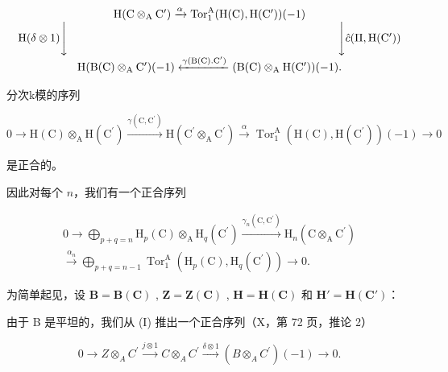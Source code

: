 \[
\begin{array}{c} \mathrm{H} (\mathrm{C} \otimes_ {\mathrm{A}} \mathrm{C} ^ {\prime}) \xrightarrow {\alpha} \operatorname{Tor} _ {1} ^ {\mathrm{A}} (\mathrm{H} (\mathrm{C}), \mathrm{H} (\mathrm{C} ^ {\prime})) (- 1) \\ \mathrm{H} (\delta \otimes 1) \Biggl \downarrow \qquad \qquad \qquad \qquad \qquad \qquad \qquad \qquad \qquad \qquad \qquad \qquad \Biggl \downarrow \hat {c} (\Pi , \mathrm{H} (\mathrm{C} ^ {\prime})) \\ \mathrm{H} (\mathrm{B} (\mathrm{C}) \otimes_ {\mathrm{A}} \mathrm{C} ^ {\prime}) (- 1) \xleftarrow {\gamma (\mathrm{B} (\mathrm{C}) . \mathrm{C} ^ {\prime})} (\mathrm{B} (\mathrm{C}) \otimes_ {\mathrm{A}} \mathrm{H} (\mathrm{C} ^ {\prime})) (- 1). \end{array}
\]

分次k模的序列

\[
0 \longrightarrow \mathrm{H} (\mathrm{C}) \otimes_ {\mathrm{A}} \mathrm{H} \left(\mathrm{C} ^ {\prime}\right) \xrightarrow {\gamma \left(\mathrm{C} , \mathrm{C} ^ {\prime}\right)} \mathrm{H} \left(\mathrm{C} ^ {\prime} \otimes_ {\mathrm{A}} \mathrm{C} ^ {\prime}\right) \xrightarrow {\alpha} \operatorname{Tor} _ {1} ^ {\mathrm{A}} \left(\mathrm{H} (\mathrm{C}), \mathrm{H} \left(\mathrm{C} ^ {\prime}\right)\right) (- 1) \longrightarrow 0
\]

是正合的。

因此对每个 \( n \)，我们有一个正合序列

\[
\begin{array}{c} 0 \longrightarrow \bigoplus_ {p + q = n} \mathrm{H} _ {p} (\mathrm{C}) \otimes_ {\mathrm{A}} \mathrm{H} _ {q} (\mathrm{C} ^ {\prime}) \xrightarrow {\gamma_ {n} (\mathrm{C} , \mathrm{C} ^ {\prime})} \mathrm{H} _ {n} (\mathrm{C} \otimes_ {\mathrm{A}} \mathrm{C} ^ {\prime}) \\ \xrightarrow {\alpha_ {n}} \bigoplus_ {p + q = n - 1} \operatorname{Tor} _ {1} ^ {\mathrm{A}} \left(\mathrm{H} _ {p} (\mathrm{C}), \mathrm{H} _ {q} (\mathrm{C} ^ {\prime})\right) \longrightarrow 0. \end{array}\tag{11}
\]

为简单起见，设 \(\mathbf{B} = \mathbf{B}(\mathbf{C})\) , \(\mathbf{Z} = \mathbf{Z}(\mathbf{C})\) , \(\mathbf{H} = \mathbf{H}(\mathbf{C})\) 和 \(\mathbf{H}' = \mathbf{H}(\mathbf{C}')\)：

由于 B 是平坦的，我们从 (I) 推出一个正合序列（X，第 72 页，推论 2）

\[
0 \longrightarrow Z \otimes_ {A} C ^ {\prime} \xrightarrow {j \otimes 1} C \otimes_ {A} C ^ {\prime} \xrightarrow {\delta \otimes 1} (B \otimes_ {A} C ^ {\prime}) (- 1) \longrightarrow 0.\tag{12}
\]

